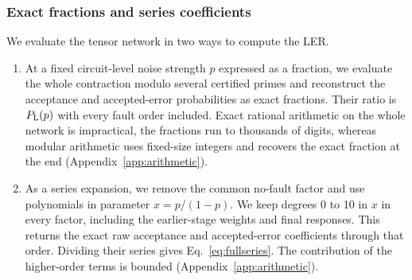 \subsubsection{Exact fractions and series coefficients}
We evaluate the tensor network in two ways to compute the LER. 
\begin{enumerate}
\item At a fixed circuit-level noise strength $p$ expressed as a fraction, we evaluate the whole contraction modulo several certified primes and reconstruct the acceptance and accepted-error probabilities as exact fractions. 
Their ratio is $P_{\mathrm L}(p)$ with every fault order included.
Exact rational arithmetic on the whole network is impractical, the fractions run to thousands of digits, whereas modular arithmetic uses fixed-size integers and recovers the exact fraction at the end (Appendix~\ref{app:arithmetic}).
\item As a series expansion, we remove the common no-fault factor and use
polynomials in parameter $x=p/(1-p)$. We keep degrees 0 to 10 in $x$ in every factor, including the earlier-stage weights and final responses. This returns the exact raw acceptance and
accepted-error coefficients through that order. Dividing their series
gives Eq.~\eqref{eq:fullseries}. The contribution of the higher-order terms is bounded (Appendix~\ref{app:arithmetic}).
\end{enumerate}

